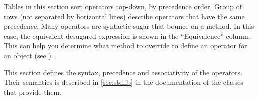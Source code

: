 Tables in this section sort operators top-down, by precedence order.
Group of rows (not separated by horizontal lines) describe operators
that have the same precedence. Many operators are syntactic sugar that
bounce on a method. In this case, the equivalent desugared expression
is shown in the ``Equivalence'' column. This can help you determine
what method to override to define an operator for an object (see
).

This section defines the syntax, precedence and associativity of the
operators. Their semantics is described in \autoref{sec:stdlib} in the
documentation of the classes that provide them.

\newcommand{\operatorhead}{Operator & Use & Associativity & Original semantic
  & Equivalence\\}


\newcommand{\operator}[6][ ]{\lstinline@#2@&\lstinline@#3@&#4&#5&\lstinline@#6@#1\\}
\newcommand{\boperator}[3]{\operator{#1}{a #1 b}{#2}{#3}{a.'#1'(b)}}
\newcommand{\poperator}[3]{\operator{#1}{#1a}{#2}{#3}{a.'#1'()}}

\newcommand{\operatordot}    {\operator  {.}    {a.b}              {-}     {Message sending}          {Not redefinable}       }
\newcommand{\operatordota}   {\operator  {.}    {a.b(args)}        {-}     {Message sending}          {Not redefinable}       }
\newcommand{\operatorsub}    {\operator  {[]}   {a[args]}          {-}     {Subscript}                {a.'[]'(args)}          }
\newcommand{\operatorsubass} {\operator  {[] =} {a[args] = v}      {-}     {Subscript assignment}     {a.'[]='(args, v)}      }
\newcommand{\operatorass}[2][ ]    {\operator[#1]
                                         {=}    {a = b}            {Right} {Assignment}               {updateSlot("a", b)}    }

\newcommand{\operatoriass}[1]{\operator  {#1=}  {a #1= b}          {Right} {In place assignment}      {a = a #1 b}            }
\newcommand{\operatorsiass}  {
    \operatoriass{+}
    \operatoriass{-}
    \operatoriass{*}
    \operatoriass{/}
    \operatoriass{\%}
    \operatoriass{\^}
    \operatoriass{\~}
}
\newcommand{\operatorinc}    {\operator  {++}   {a++}              {-}     {Incrementation}           {(a = a + 1) - 1}       }
\newcommand{\operatordec}    {\operator  {--}   {a--}              {-}     {Incrementation}           {(a = a - 1) + 1}       }

